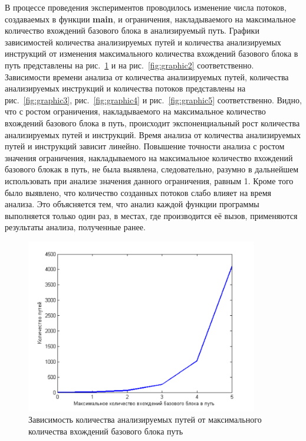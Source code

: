 

В процессе проведения экспериментов проводилось изменение числа потоков, создаваемых в функции \textbf{main}, и ограничения, накладываемого на максимальное количество вхождений базового блока в анализируемый путь. Графики зависимостей количества анализируемых путей и количества анализируемых инструкций от изменения максимального количества вхождений базового блока в путь представлены на рис.~\ref{fig:graphic1} и на рис.~\ref{fig:graphic2} соответственно. Зависимости времени анализа от количества анализируемых путей, количества анализируемых инструкций и количества потоков представлены на рис.~\ref{fig:graphic3}, рис.~\ref{fig:graphic4} и рис.~\ref{fig:graphic5} соответственно. Видно, что с ростом ограничения, накладываемого на максимальное количество вхождений базового блока в путь, происходит экспоненциальный рост количества анализируемых путей и инструкций. Время анализа от количества анализируемых путей и инструкций зависит линейно. Повышение точности анализа с ростом значения ограничения, накладываемого на максимальное количество вхождений базового блокак в путь, не была выявлена, следовательно, разумно  в дальнейшем использовать при анализе значения данного ограничения, равным 1. Кроме того было выявлено, что количество созданных потоков слабо влияет на время анализа. Это объясняется тем, что анализ каждой функции программы выполняется только один раз, в местах, где производится её вызов, применяются результаты анализа, полученные ранее.

\begin{figure}
  \centering
  \includegraphics[width=0.9\textwidth]{inc/png/graphic1}
  \caption{Зависимость количества анализируемых путей от максимального количества вхождений базового блока путь}
  \label{fig:graphic1}
\end{figure}

